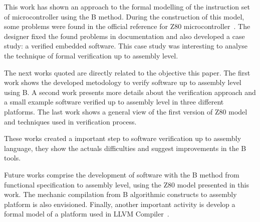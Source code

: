 \documentclass[a4paper]{llncs}
\begin{document}
This work has shown an approach to the formal modelling of the instruction set of
microcontroller using the B method. During the construction of this model, some
problems were found in the official reference for Z80
microcontroller~\cite{Z80_manual}. The designer fixed the found problems in
documentation and also developed a case study: a verified embedded software. This
case study was interesting to analyse the technique of formal verification up to
assembly level. 


The next works quoted are directly related to the objective this paper.
The first work \cite{DantasSemish2008} shows the developed metodology to verify
software up to assembly level using B. A second work\cite{Dantas_SBMF08}
presents more details about the verification approach and a small example
software verified up to assembly level in three different platforms. 
The last work \cite{Valerio_SBMF09} shows a general view of the first version of Z80
model and techniques used in verification process.

These works created a important step to software verification up to assembly
language, they show the actuals difficulties and suggest improvements in the
B tools. 





Future works comprise the development of software with the B method from
functional specification to assembly level, using the Z80 model presented in this
work. The mechanic compilation from B algorithmic constructs to assembly platform
is also envisioned. Finally, another important activity is develop a formal model of a platform used in LLVM Compiler~\cite{DBLP:conf/cgo/LattnerA04}.




  

%




% 
\end{document}
